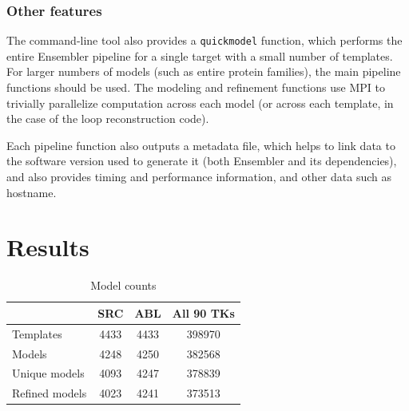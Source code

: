\documentclass[aps,pre,twocolumn,nofootinbib,superscriptaddress,linenumbers]{revtex4-1}
\begin{document}
\subsubsection{Other features}

The command-line tool also provides a {\tt quickmodel} function, which performs the entire Ensembler pipeline for a single target with a small number of templates.
For larger numbers of models (such as entire protein families), the main pipeline functions should be used.
The modeling and refinement functions use MPI to trivially parallelize computation across each model (or across each template, in the case of the loop reconstruction code).

Each pipeline function also outputs a metadata file, which helps to link data to the software version used to generate it (both Ensembler and its dependencies), and also provides timing and performance information, and other data such as hostname.






\label{section:design}

\section{Results}
\label{section:results}

\begin{table}
\begin{tabular}{l|c|c|c}

    & SRC & ABL & All 90 TKs \\
    \hline
    Templates & \num{4433} & \num{4433} & \num{398970} \\
    Models & \num{4248} & \num{4250} & \num{382568} \\
    Unique models & \num{4093} & \num{4247} & \num{378839} \\
    Refined models & \num{4023} & \num{4241} & \num{373513} \\

\end{tabular}
\label{tab:model_counts}
\caption{Model counts}
\end{table}
\end{document}
